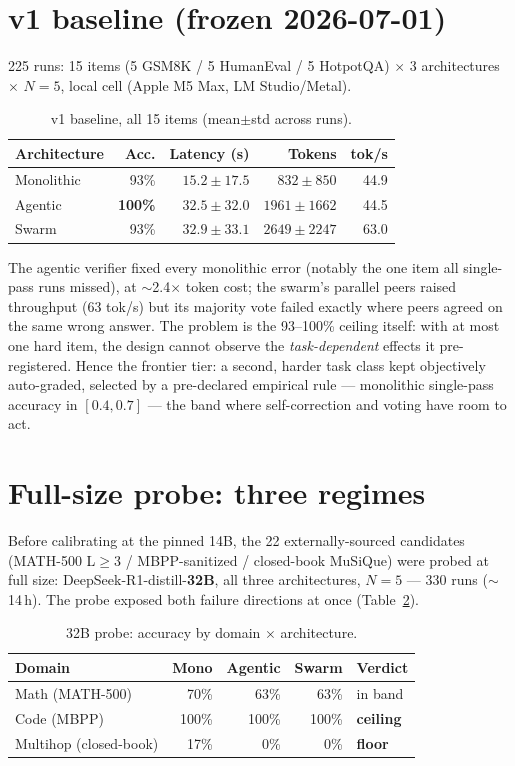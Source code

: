 \documentclass[sigconf,nonacm]{acmart}
\begin{document}
\section{v1 baseline (frozen 2026-07-01)}
225 runs: 15 items (5 GSM8K / 5 HumanEval / 5 HotpotQA) $\times$ 3 architectures
$\times$ $N{=}5$, local cell (Apple M5 Max, LM Studio/Metal).

\begin{table}[h]
\caption{v1 baseline, all 15 items (mean$\pm$std across runs).}
\label{tab:v1}
\begin{tabular}{lrrrr}
\toprule
Architecture & Acc. & Latency (s) & Tokens & tok/s\\
\midrule
Monolithic & 93\% & $15.2\pm17.5$ & $832\pm850$ & 44.9\\
Agentic    & \textbf{100\%} & $32.5\pm32.0$ & $1961\pm1662$ & 44.5\\
Swarm      & 93\% & $32.9\pm33.1$ & $2649\pm2247$ & 63.0\\
\bottomrule
\end{tabular}
\end{table}

The agentic verifier fixed every monolithic error (notably the one item all
single-pass runs missed), at $\sim$2.4$\times$ token cost; the swarm's parallel peers
raised throughput (63 tok/s) but its majority vote failed exactly where peers agreed on
the same wrong answer. The problem is the 93--100\% ceiling itself: with at most one
hard item, the design cannot observe the \emph{task-dependent} effects it
pre-registered. Hence the frontier tier: a second, harder task class kept objectively
auto-graded, selected by a pre-declared empirical rule --- monolithic single-pass
accuracy in $[0.4, 0.7]$ --- the band where self-correction and voting have room to act.

\section{Full-size probe: three regimes}
Before calibrating at the pinned 14B, the 22 externally-sourced candidates
(MATH-500 L$\geq$3 / MBPP-sanitized / closed-book MuSiQue) were probed at full size:
DeepSeek-R1-distill-\textbf{32B}, all three architectures, $N{=}5$ --- 330 runs
($\sim$14\,h). The probe exposed both failure directions at once
(Table~\ref{tab:probe}).

\begin{table}[h]
\caption{32B probe: accuracy by domain $\times$ architecture.}
\label{tab:probe}
\begin{tabular}{lrrrl}
\toprule
Domain & Mono & Agentic & Swarm & Verdict\\
\midrule
Math (MATH-500)        & 70\% & 63\% & 63\% & in band\\
Code (MBPP)            & 100\% & 100\% & 100\% & \textbf{ceiling}\\
Multihop (closed-book) & 17\% & 0\% & 0\% & \textbf{floor}\\
\bottomrule
\end{tabular}
\end{table}
\end{document}
